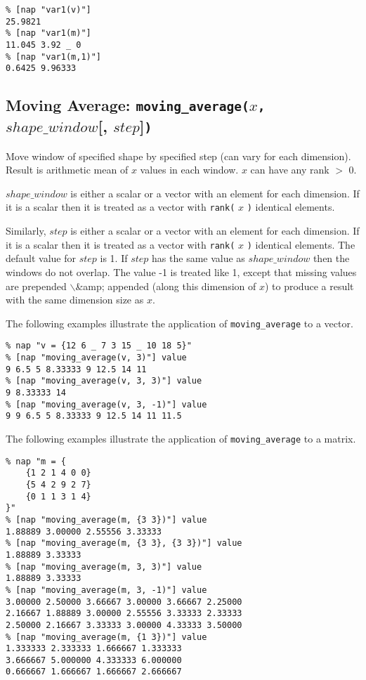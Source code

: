   \begin{verbatim}
% [nap "var1(v)"]
25.9821
% [nap "var1(m)"]
11.045 3.92 _ 0
% [nap "var1(m,1)"]
0.6425 9.96333
\end{verbatim}

  \subsection{
    \label{moving-average}Moving Average: \texttt{moving\_average(}$x$\texttt{,} $shape\_window$[, $step$]\texttt{)}
  }
Move window of specified shape by specified step (can vary for
  each dimension). Result is arithmetic mean of 
  $x$ values in each window. 
  $x$ can have any rank $>$ 0.
  


  $shape\_window$ is either a scalar or a vector with an
  element for each dimension. If it is a scalar then it is treated as a
  vector with 
  \texttt{rank(}
  $x$
  \texttt{)} identical elements.
  

Similarly, 
  $step$ is either a scalar or a vector with an element for
  each dimension. If it is a scalar then it is treated as a vector with
  \texttt{rank(}
  $x$
  \texttt{)} identical elements. The default value for 
  $step$ is 1. If 
  $step$ has the same value as 
  $shape\_window$ then the windows do not overlap. The value -1
  is treated like 1, except that missing values are prepended $\backslash$\&amp;
  appended (along this dimension of 
  $x$) to produce a result with the same dimension size as 
  $x$.
  

The following examples illustrate the application of 
  \texttt{moving\_average} to a vector.
  \begin{verbatim}
% nap "v = {12 6 _ 7 3 15 _ 10 18 5}"
% [nap "moving_average(v, 3)"] value
9 6.5 5 8.33333 9 12.5 14 11
% [nap "moving_average(v, 3, 3)"] value
9 8.33333 14
% [nap "moving_average(v, 3, -1)"] value
9 9 6.5 5 8.33333 9 12.5 14 11 11.5
\end{verbatim}

  

The following examples illustrate the application of 
  \texttt{moving\_average} to a matrix.
  \begin{verbatim}
% nap "m = {
    {1 2 1 4 0 0}
    {5 4 2 9 2 7}
    {0 1 1 3 1 4}
}"
% [nap "moving_average(m, {3 3})"] value
1.88889 3.00000 2.55556 3.33333
% [nap "moving_average(m, {3 3}, {3 3})"] value
1.88889 3.33333
% [nap "moving_average(m, 3, 3)"] value
1.88889 3.33333
% [nap "moving_average(m, 3, -1)"] value
3.00000 2.50000 3.66667 3.00000 3.66667 2.25000
2.16667 1.88889 3.00000 2.55556 3.33333 2.33333
2.50000 2.16667 3.33333 3.00000 4.33333 3.50000
% [nap "moving_average(m, {1 3})"] value
1.333333 2.333333 1.666667 1.333333
3.666667 5.000000 4.333333 6.000000
0.666667 1.666667 1.666667 2.666667
\end{verbatim}

